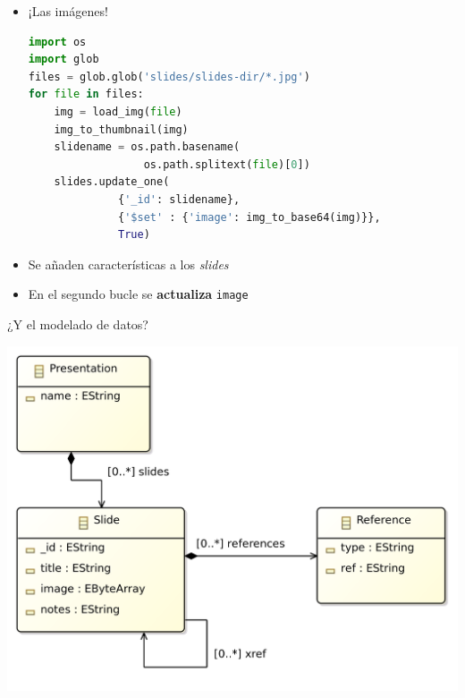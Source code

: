 \documentclass[14pt]{beamer}
\begin{document}
\begin{frame}
\begin{itemize}
\framebreak

\item ¡Las imágenes!

\begin{lstlisting}[language=python]
import os
import glob
files = glob.glob('slides/slides-dir/*.jpg')
for file in files:
    img = load_img(file)
    img_to_thumbnail(img)
    slidename = os.path.basename(
                  os.path.splitext(file)[0])
    slides.update_one(
              {'_id': slidename},
              {'$set' : {'image': img_to_base64(img)}},
              True)
\end{lstlisting}

  \framebreak

\item Se añaden características a los {\em slides}
\item En el segundo bucle se {\bf actualiza} {\tt image}
\end{itemize}

\begin{alertblock}{¿Y el modelado de datos?}
\end{alertblock}

\framebreak

\centering\includegraphics[width=.9\textwidth]{img/slides-data-model}

\framebreak


\end{frame}
\end{document}
